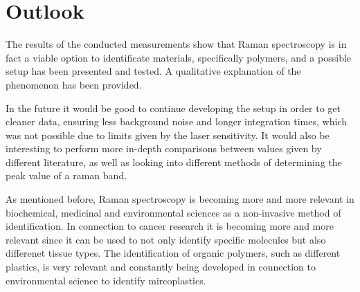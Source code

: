 \section{Outlook}
The results of the conducted measurements show that Raman spectroscopy is in fact a viable option to identificate materials, specifically polymers, and a possible setup has been presented and tested. A qualitative explanation of the phenomenon has been provided.

\bigskip

In the future it would be good to continue developing the setup in order to get cleaner data, ensuring less background noise and longer integration times, which was not possible due to limits given by the laser sensitivity. It would also be interesting to perform more in-depth comparisons between values given by different literature, as well as looking into different methods of determining the peak value of a raman band.

\bigskip

As mentioned before, Raman spectroscopy is becoming more and more relevant in biochemical, medicinal and environmental sciences as a non-invasive method of identification. In connection to cancer research it is becoming more and more relevant since it can be used to not only identify specific molecules but also differenet tissue types. The identification of organic polymers, such as different plastics, is very relevant and constantly being developed in connection to environmental science to identify mircoplastics.
